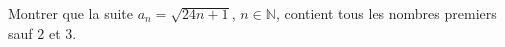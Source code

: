 Montrer que la suite $a_n = \sqrt{24n + 1}$, $n \in \mathbb{N}$, contient tous les nombres premiers sauf $2$ et $3$.

